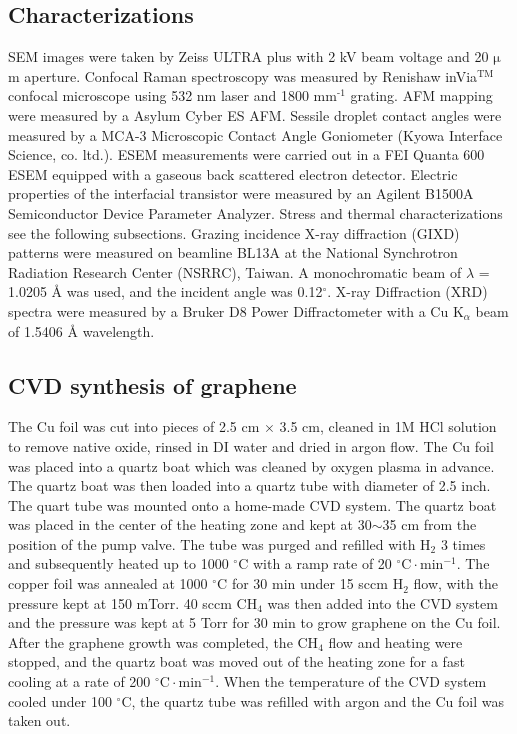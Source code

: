 \subsection{Characterizations}
\label{sec:small-org048d24a}
SEM images were taken by Zeiss ULTRA plus with 2 kV beam voltage
and 20 \(\mathrm{\mu}\)m aperture. Confocal Raman spectroscopy was
measured by Renishaw inVia\(^{\textrm{TM}}\) confocal microscope using
532 nm laser and 1800 mm\(^{\text{-1}}\) grating. AFM mapping were measured by
a Asylum Cyber ES AFM. Sessile droplet contact angles were measured
by a MCA-3 Microscopic Contact Angle Goniometer (Kyowa Interface
Science, co. ltd.). ESEM measurements were carried out in a FEI
Quanta 600 ESEM equipped with a gaseous back scattered electron
detector. Electric properties of the interfacial transistor were
measured by an Agilent B1500A Semiconductor Device Parameter
Analyzer. Stress and thermal characterizations see the following
subsections. Grazing incidence X-ray diffraction (GIXD) patterns
were measured on beamline BL13A at the National Synchrotron
Radiation Research Center (NSRRC), Taiwan. A monochromatic beam of
\(\lambda\) = 1.0205 \AA{} was used, and the incident angle was
0.12\(^{\circ}\). X-ray Diffraction (XRD) spectra were measured by
a Bruker D8 Power Diffractometer with a Cu K\(_{\alpha}\) beam of
1.5406 \AA{} wavelength.
\subsection{CVD synthesis of graphene}
\label{sec:small-org7dad228}

The Cu foil was cut into pieces of 2.5 cm \(\times\) 3.5 cm, cleaned in 1M
HCl solution to remove native oxide, rinsed in DI water and dried in
argon flow. The Cu foil was placed into a quartz boat which was
cleaned by oxygen plasma in advance. The quartz boat was then loaded
into a quartz tube with diameter of 2.5 inch. The quart tube was
mounted onto a home-made CVD system. The quartz boat was placed in the
center of the heating zone and kept at 30\(\sim\)35 cm from the position of
the pump valve. The tube was purged and refilled with H\(_{\text{2}}\) 3 times
and subsequently heated up to 1000 \(^\circ \mathrm{C}\) with a ramp
rate of 20 \(^{\circ}\mathrm{C} \cdot \mathrm{min}^{-1}\). The copper
foil was annealed at 1000 \(^\circ \mathrm{C}\) for 30 min under 15 sccm
H\(_{\text{2}}\) flow, with the pressure kept at 150 mTorr. 40 sccm CH\(_{\text{4}}\) was
then added into the CVD system and the pressure was kept at 5 Torr for
30 min to grow graphene on the Cu foil. After the graphene growth
was completed, the CH\(_{\text{4}}\) flow and heating were stopped, and the quartz
boat was moved out of the heating zone for a fast cooling at a rate of
200 \(^{\circ}\mathrm{C} \cdot \mathrm{min}^{-1}\). When the temperature
of the CVD system cooled under 100 \(^{\circ}\mathrm{C}\), the quartz tube
was refilled with argon and the Cu foil was taken out.

